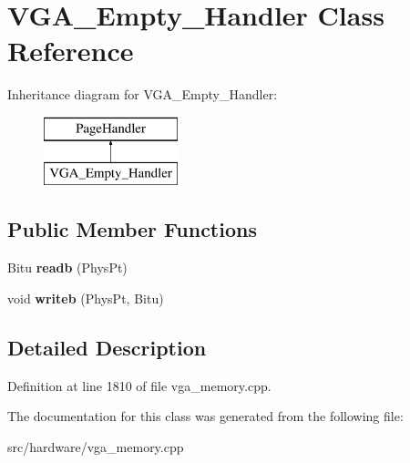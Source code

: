 \hypertarget{classVGA__Empty__Handler}{\section{V\-G\-A\-\_\-\-Empty\-\_\-\-Handler Class Reference}
\label{classVGA__Empty__Handler}
}
Inheritance diagram for V\-G\-A\-\_\-\-Empty\-\_\-\-Handler\-:\begin{figure}[H]
\begin{center}
\leavevmode
\includegraphics[height=2.000000cm]{classVGA__Empty__Handler}
\end{center}
\end{figure}
\subsection*{Public Member Functions}
\begin{DoxyCompactItemize}
\item 
\hypertarget{classVGA__Empty__Handler_ae84a276c3421d6db0f08b48d81692905}{Bitu {\bfseries readb} (Phys\-Pt)}\label{classVGA__Empty__Handler_ae84a276c3421d6db0f08b48d81692905}

\item 
\hypertarget{classVGA__Empty__Handler_a291f19e5b04518175d51cb6089424004}{void {\bfseries writeb} (Phys\-Pt, Bitu)}\label{classVGA__Empty__Handler_a291f19e5b04518175d51cb6089424004}

\end{DoxyCompactItemize}


\subsection{Detailed Description}


Definition at line 1810 of file vga\-\_\-memory.\-cpp.



The documentation for this class was generated from the following file\-:\begin{DoxyCompactItemize}
\item 
src/hardware/vga\-\_\-memory.\-cpp\end{DoxyCompactItemize}
